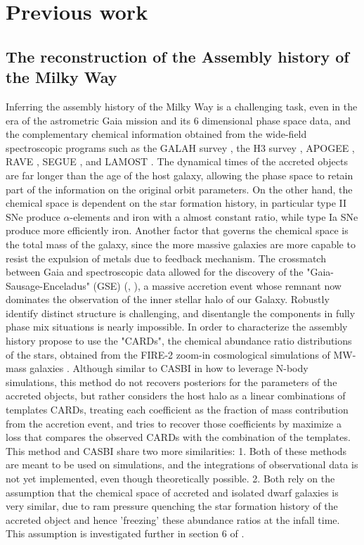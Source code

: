 \chapter{Previous work}

\section{The reconstruction of the Assembly history of the Milky Way}
Inferring the assembly history of the Milky Way is a challenging task, even in the era of the astrometric Gaia mission and its 6 dimensional 
phase space data, and the complementary chemical information obtained from the wide-field spectroscopic programs such as the GALAH survey
\cite{desilvaGALAHSurveyScientific2015}, the H3 survey \cite{conroyMappingStellarHalo2019}, APOGEE \cite{majewskiApachePointObservatory2017}, RAVE \cite{steinmetzRadialVelocityExperiment2006},  SEGUE \cite{yannySEGUESPECTROSCOPICSURVEY2009}, and 
LAMOST \cite{cuiLargeSkyArea2012}. The dynamical times of the accreted objects are far longer than the age of the host galaxy, allowing the 
phase space to retain part of the information on the original orbit parameters. On the other hand, the chemical space is dependent on the star formation history, in particular type II SNe produce $\alpha$-elements and iron with a almost constant ratio, while type Ia SNe produce more efficiently iron. Another factor that governs the chemical space is the total mass of the galaxy, since the more massive galaxies are more capable to resist the expulsion of metals due to feedback mechanism. The crossmatch between Gaia and spectroscopic data allowed for the discovery of the "Gaia-Sausage-Enceladus" (GSE) (\cite{belokurovCoformationDiscStellar2018}, \cite{helmiMergerThatLed2018}), a massive accretion event whose remnant now dominates the observation of the inner stellar halo of our Galaxy. Robustly identify distinct structure is challenging, and 
disentangle the components in fully phase mix situations is nearly impossible. In order to characterize the assembly history \cite{cunninghamReadingCARDsImprint2022}
propose to use the "CARDs", the chemical abundance ratio distributions of the stars, obtained from the FIRE-2 zoom-in cosmological simulations of MW-mass galaxies \cite{wetzelRECONCILINGDWARFGALAXIES2016}.
Although similar to CASBI in how to leverage N-body simulations, this method do not recovers posteriors for the parameters of the accreted objects, but rather considers the host halo as a linear combinations of templates CARDs, treating each coefficient as the fraction of mass contribution from the accretion event, and tries to recover those coefficients by maximize a loss that compares the observed CARDs with the combination of the templates. This method and CASBI share two more similarities: 1. Both of these methods are meant to be used on simulations, and the integrations of observational data is not yet implemented, even though theoretically possible. 2. Both rely on the assumption that the chemical space of accreted and isolated dwarf galaxies is very similar, due to ram pressure quenching the star formation history of the accreted object and hence 'freezing' these abundance ratios at the infall time. This assumption is investigated further in section 6 of \cite{cunninghamReadingCARDsImprint2022}. 
